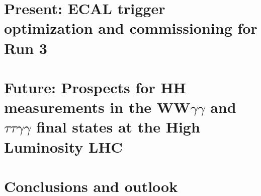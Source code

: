 \documentclass[thesis]{neu}
\begin{document}
\chapter{Present: ECAL trigger optimization and commissioning for Run 3}\label{chapter:ECAL_Run3}


\chapter{Future: Prospects for HH measurements in the WW\texorpdfstring{$\gamma\gamma$}{yy} and \texorpdfstring{$\tau\tau\gamma\gamma$}{tautauyy} final states at the High Luminosity LHC} \label{chapter:Phase_II_HH}


\chapter{Conclusions and outlook} \label{chapter:summary}




    
    
{
    \clearpage
    \appendix
    
    
    \clearpage
    
    \clearpage
    
    \clearpage
    
    \clearpage
    
    
} 
{
}      
\end{document}
